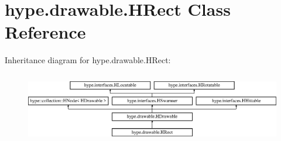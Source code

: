 \hypertarget{classhype_1_1drawable_1_1_h_rect}{\section{hype.\-drawable.\-H\-Rect Class Reference}
\label{classhype_1_1drawable_1_1_h_rect}
}
Inheritance diagram for hype.\-drawable.\-H\-Rect\-:\begin{figure}[H]
\begin{center}
\leavevmode
\includegraphics[height=3.111111cm]{classhype_1_1drawable_1_1_h_rect}
\end{center}
\end{figure}
